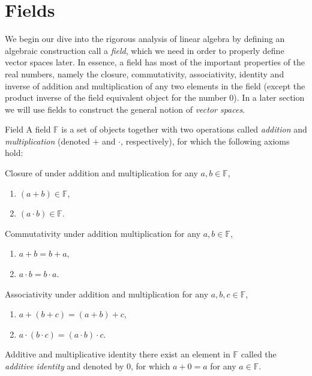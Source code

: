 \section{Fields}
We begin our dive into the rigorous analysis of linear algebra by defining an algebraic construction call a \emph{field}, which we need in order to properly define vector spaces later. In essence, a field has most of the important properties of the real numbers, namely the closure, commutativity, associativity, identity and inverse of addition and multiplication of any two elements in the field (except the product inverse of the field equivalent object for the number $0$). In a later section we will use fields to construct the general notion of \emph{vector spaces}.

\begin{definition}{Field}{}
	A field $\mathbb{F}$ is a set of objects together with two operations called \emph{addition} and \emph{multiplication} (denoted $+$ and $\cdot$, respectively), for which the following axioms hold:

	\begin{descitemize}
		\item[Closure of under addition and multiplication] for any $a,b\in\mathbb{F}$,
			\begin{enumerate}
				\item $(a+b)\in\mathbb{F}$,
				\item $(a\cdot b)\in\mathbb{F}$.
			\end{enumerate}

		\item[Commutativity under addition multiplication] for any $a,b\in\mathbb{F}$,
			\begin{enumerate}
				\item $a+b=b+a$,
				\item $a\cdot b=b\cdot a$.
			\end{enumerate}

		\item[Associativity under addition and multiplication] for any $a,b,c\in\mathbb{F}$,
			\begin{enumerate}
				\item $a+(b+c)=(a+b)+c$,
				\item $a\cdot(b\cdot c)=(a\cdot b)\cdot c$.
			\end{enumerate}

		\item[Additive and multiplicative identity] there exist an element in $\mathbb{F}$ called the \textit{additive identity} and denoted by $0$, for which $a+0=a$ for any $a\in\mathbb{F}$.
			

\end{descitemize}
\end{definition}
